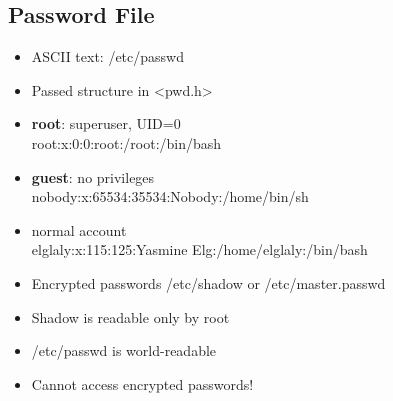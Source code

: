 \documentclass[10pt]{article}
\begin{document}
\scriptsize
\begin{multicols}{2}
    \begin{minipage}{\columnwidth}
        \subsection*{Password File}
        \begin{itemize}[leftmargin=*]
            \setlength{\itemsep}{0em}
            \item ASCII text: /etc/passwd
            \item Passed structure in <pwd.h>
            \item \textbf{root}: superuser, UID=0\\root:x:0:0:root:/root:/bin/bash
            \item \textbf{guest}: no privileges\\nobody:x:65534:35534:Nobody:/home/bin/sh
            \item normal account\\elglaly:x:115:125:Yasmine Elg:/home/elglaly:/bin/bash
            \item Encrypted passwords /etc/shadow or /etc/master.passwd
            \item Shadow is readable only by root
            \item /etc/passwd is world-readable
            \item Cannot access encrypted passwords!
        \end{itemize}

\end{minipage}
\end{multicols}
\end{document}
